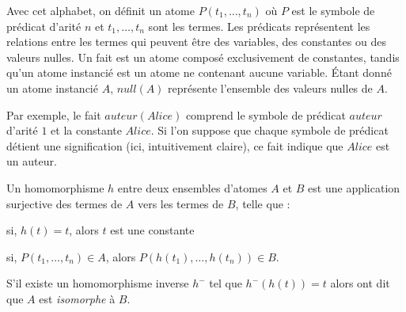 \begin{definition}[Atome]
Avec cet alphabet, on définit un atome $P(t_1, \dots, t_n)$ où $P$ est le symbole de prédicat d'arité $n$ et $t_1, \dots, t_n$ sont les termes.
Les prédicats représentent les relations entre les termes qui peuvent être des variables, des constantes ou des valeurs nulles.
Un fait est un atome composé exclusivement de constantes, tandis qu'un atome instancié est un atome ne contenant aucune variable.
Étant donné un atome instancié $A$, $null(A)$ représente l'ensemble des valeurs nulles de $A$.

Par exemple, le fait $auteur(Alice)$ comprend le symbole de prédicat $auteur$ d'arité $1$ et la constante $Alice$.
Si l'on suppose que chaque symbole de prédicat détient une signification (ici, intuitivement claire), ce fait indique que $Alice$ est un auteur.
\end{definition}

\begin{definition}[Homomorphisme]
Un homomorphisme $h$ entre deux ensembles d'atomes $A$ et $B$ est une application surjective des termes de $A$ vers les termes de $B$, telle que :
\begin{enumerate*}[label=(\roman*)]
    \item si, $h(t) = t$, alors $t$ est une constante
    \item si, $P(t_1, \dots, t_n) \in A$, alors $P(h(t_1), \dots, h(t_n)) \in B$.
\end{enumerate*}
S'il existe un homomorphisme inverse $h^-$ tel que $h^-(h(t)) = t$ alors ont dit que $A$ est \emph{isomorphe} à $B$.
\end{definition}


